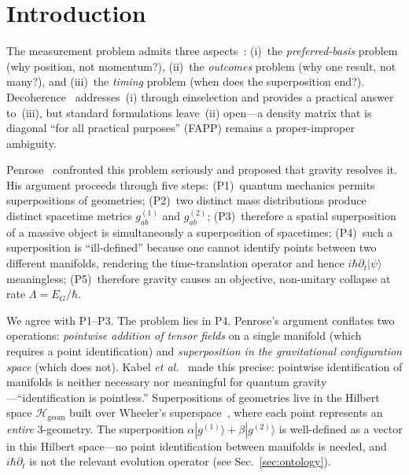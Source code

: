 \documentclass[prl,twocolumn,superscriptaddress,longbibliography,floatfix]{revtex4-2}
\newcommand{\hilb}{\mathcal{H}}
\newcommand{\ket}[1]{|#1\rangle}
\begin{document}
\section{Introduction}
\label{sec:intro}

The measurement problem admits three aspects~\cite{Schlosshauer2007}:
(i)~the \emph{preferred-basis} problem (why position, not
momentum?), (ii)~the \emph{outcomes} problem (why one result, not
many?), and (iii)~the \emph{timing} problem (when does the
superposition end?).  Decoherence~\cite{Zurek2003,Joos2003}
addresses~(i) through einselection and provides a practical answer
to~(iii), but standard formulations leave~(ii) open---a density
matrix that is diagonal ``for all practical purposes'' (FAPP)
remains a proper-improper ambiguity.

Penrose~\cite{Penrose1996,Penrose2014} confronted this problem
seriously and proposed that gravity resolves it.  His argument
proceeds through five steps:
(P1)~quantum mechanics permits superpositions of geometries;
(P2)~two distinct mass distributions produce distinct spacetime
metrics $g_{ab}^{(1)}$ and $g_{ab}^{(2)}$;
(P3)~therefore a spatial superposition of a massive object is
simultaneously a superposition of spacetimes;
(P4)~such a superposition is ``ill-defined'' because one cannot
identify points between two different manifolds, rendering the
time-translation operator and hence $i\hbar\partial_t\ket{\psi}$
meaningless;
(P5)~therefore gravity causes an objective, non-unitary collapse at
rate $\Lambda = E_G/\hbar$.

We agree with P1--P3.  The problem lies in P4.  Penrose's argument
conflates two operations: \emph{pointwise addition of tensor fields}
on a single manifold (which requires a point identification) and
\emph{superposition in the gravitational configuration space}
(which does not).  Kabel \emph{et al.}~\cite{Kabel2024} made this
precise: pointwise identification of manifolds is neither
necessary nor meaningful for quantum gravity---``identification is
pointless.''  Superpositions of geometries live in the Hilbert
space $\hilb_{\mathrm{geom}}$ built over Wheeler's
superspace~\cite{DeWitt1967}, where each point represents an
\emph{entire} 3-geometry.  The superposition
$\alpha\ket{g^{(1)}} + \beta\ket{g^{(2)}}$ is well-defined as a
vector in this Hilbert space---no point identification between
manifolds is needed, and $i\hbar\partial_t$ is not the relevant
evolution operator (see Sec.~\ref{sec:ontology}).
\end{document}
